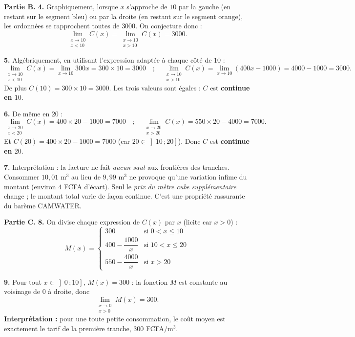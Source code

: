 \documentclass[11pt]{article}
\begin{document}
\begin{exoresolu}
\textbf{Partie B. 4.} Graphiquement, lorsque $x$ s'approche de $10$ par la gauche (en restant sur le segment bleu) ou par la droite (en restant sur le segment orange), les ordonnées se rapprochent toutes de $3000$. On conjecture donc :
\[ \lim_{\substack{x \to 10 \\ x < 10}} C(x) = \lim_{\substack{x \to 10 \\ x > 10}} C(x) = 3000. \]

\textbf{5.} Algébriquement, en utilisant l'expression adaptée à chaque côté de $10$ :
\[ \lim_{\substack{x \to 10 \\ x < 10}} C(x) = \lim_{x \to 10} 300x = 300 \times 10 = 3000 \quad ; \quad \lim_{\substack{x \to 10 \\ x > 10}} C(x) = \lim_{x \to 10} (400x - 1000) = 4000 - 1000 = 3000. \]
De plus $C(10) = 300 \times 10 = 3000$. Les trois valeurs sont égales : $C$ est \textbf{continue en $10$}.

\textbf{6.} De même en $20$ :
\[ \lim_{\substack{x \to 20 \\ x < 20}} C(x) = 400 \times 20 - 1000 = 7000 \quad ; \quad \lim_{\substack{x \to 20 \\ x > 20}} C(x) = 550 \times 20 - 4000 = 7000. \]
Et $C(20) = 400 \times 20 - 1000 = 7000$ (car $20 \in \left]10\,;20\right]$). Donc $C$ est \textbf{continue en $20$}.

\textbf{7.} Interprétation : la facture ne fait \emph{aucun saut} aux frontières des tranches. Consommer $10{,}01$ m$^3$ au lieu de $9{,}99$ m$^3$ ne provoque qu'une variation infime du montant (environ $4$ FCFA d'écart). Seul le \emph{prix du mètre cube supplémentaire} change ; le montant total varie de façon continue. C'est une propriété rassurante du barème CAMWATER.

\textbf{Partie C. 8.} On divise chaque expression de $C(x)$ par $x$ (licite car $x > 0$) :
\[ M(x) = \begin{cases} 300 & \text{si } 0 < x \leq 10 \\[4pt] 400 - \dfrac{1000}{x} & \text{si } 10 < x \leq 20 \\[6pt] 550 - \dfrac{4000}{x} & \text{si } x > 20 \end{cases} \]

\textbf{9.} Pour tout $x \in \left]0\,;10\right]$, $M(x) = 300$ : la fonction $M$ est constante au voisinage de $0$ à droite, donc
\[ \lim_{\substack{x \to 0 \\ x > 0}} M(x) = 300. \]
\textbf{Interprétation :} pour une toute petite consommation, le coût moyen est exactement le tarif de la première tranche, $300$ FCFA/m$^3$.


\end{exoresolu}
\end{document}
